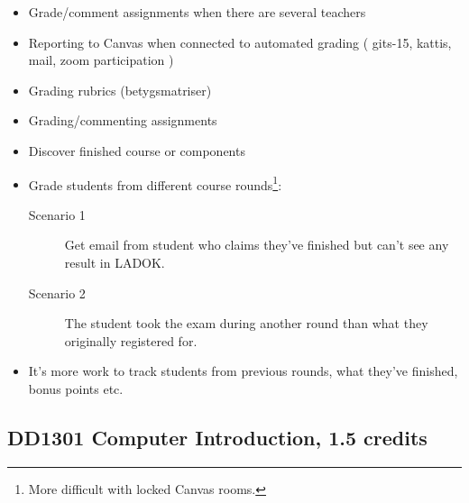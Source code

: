 \begin{frame}[fragile]
  \begin{example}[Grading]
    \begin{itemize}
      \item Grade/comment assignments when there are several teachers
      \item \alert{Reporting to Canvas when connected to automated grading (\eg 
        gits-15, kattis, mail, zoom participation \etc)}
      \item Grading rubrics (betygsmatriser)
      \item \alert{Grading/commenting assignments}
    \end{itemize}
  \end{example}
\end{frame}

\begin{frame}
  \begin{example}
    \begin{itemize}
      \item \alert<1>{Discover finished course or components}
      \item \alert<1-2>{Grade students from different course rounds}\footnote{%
          More difficult with locked Canvas rooms.
        }:
        \begin{description}
          \item[Scenario 1] \alert<1>{Get email from student who claims they've 
            finished but can't see any result in LADOK.}

          \item[Scenario 2] The student took the exam during another round than 
            what they originally registered for.
        \end{description}

      \item \alert<1>{It's more work to track students from previous rounds, 
        what they've finished, bonus points etc.}
    \end{itemize}
  \end{example}
\end{frame}

\subsection{DD1301 Computer Introduction, 1.5 credits}

